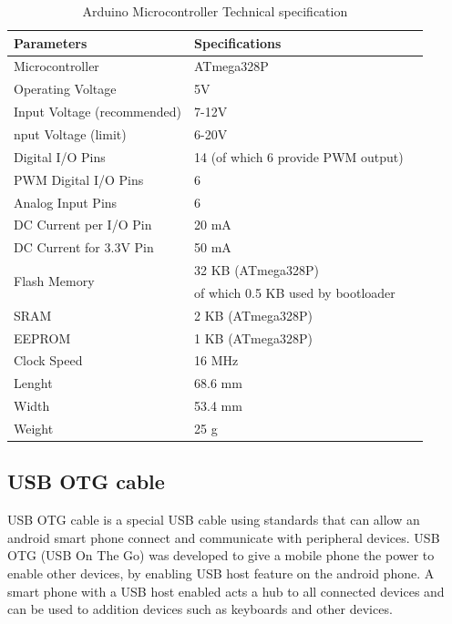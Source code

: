 \begin{table}[H]
\begin{center}
    \begin{tabular}{ |l|l|l| }
\hline
{\bfseries Parameters} & {\bfseries Specifications} \\ \hline
Microcontroller & ATmega328P \\ \hline
Operating Voltage & 5V \\ \hline
Input Voltage (recommended) & 7-12V \\ \hline
nput Voltage (limit) & 6-20V \\ \hline
Digital I/O Pins & 14 (of which 6 provide PWM output) \\ \hline
PWM Digital I/O Pins & 6 \\ \hline
Analog Input Pins & 6 \\ \hline
DC Current per I/O Pin & 20 mA \\ \hline
DC Current for 3.3V Pin & 50 mA \\ \hline
\multirow{2}{*}{Flash Memory} 
 & 32 KB (ATmega328P)  \\
 & of which 0.5 KB used by bootloader\\
\hline
SRAM & 2 KB (ATmega328P)\\ \hline
EEPROM & 1 KB (ATmega328P) \\ \hline
Clock Speed & 16 MHz \\ \hline
Lenght & 68.6 mm \\ \hline
Width & 53.4 mm \\ \hline
Weight & 25 g \\ 
\hline

\end{tabular}
\end{center}
\caption{Arduino Microcontroller Technical specification\cite{ArduinoUnoSpecs}}\label{Microcontroller}
\end{table}


\subsection{USB OTG cable }
USB OTG cable is a special USB cable using standards that can allow an android smart phone connect and communicate with peripheral devices. USB OTG (USB On The Go) was developed to give a mobile phone the power to enable other devices, by enabling USB host feature on the android phone. A smart phone with a USB host enabled acts a hub to all connected devices and can be used to addition devices such as keyboards and other devices.

